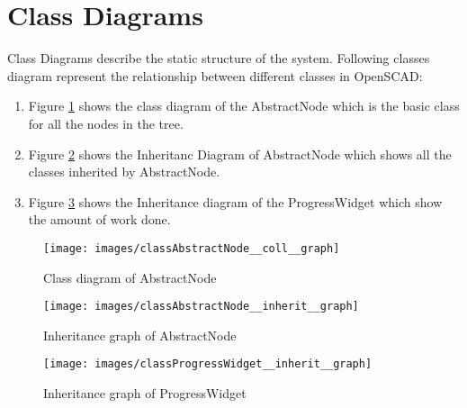 \section{Class Diagrams}
Class Diagrams describe the static structure of the system. Following classes diagram represent the relationship between different classes in OpenSCAD:
\begin{enumerate}
	\item Figure \ref{fig:classabstractnodecollgraph} shows the class diagram of the AbstractNode which is the basic class for all the nodes in the tree.
	\item Figure \ref{fig:classabstractnodeinheritgraph} shows the Inheritanc Diagram of AbstractNode which shows all the classes inherited by AbstractNode.
	\item Figure \ref{fig:classprogresswidgetinheritgraph}  shows the Inheritance diagram of the ProgressWidget which show the amount of work done.
\end{enumerate}


\begin{figure}
\centering
\texttt{[image: images/classAbstractNode\_\_coll\_\_graph]}
\caption{Class diagram of AbstractNode}
\label{fig:classabstractnodecollgraph}
\end{figure}

\begin{figure}
\centering
\texttt{[image: images/classAbstractNode\_\_inherit\_\_graph]}
\caption{Inheritance graph of AbstractNode}
\label{fig:classabstractnodeinheritgraph}
\end{figure}


\begin{figure}
\centering
\texttt{[image: images/classProgressWidget\_\_inherit\_\_graph]}
\caption{Inheritance graph of ProgressWidget}
\label{fig:classprogresswidgetinheritgraph}
\end{figure}

